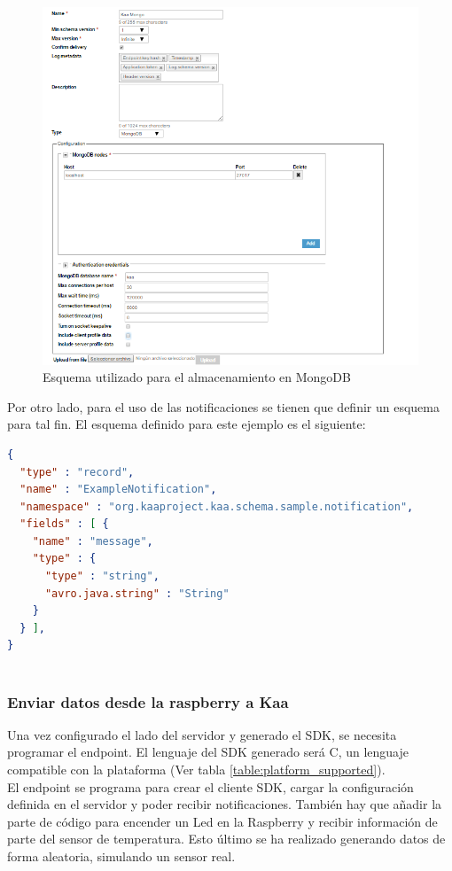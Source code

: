 \documentclass[12pt, twoside]{book}
\begin{document}
\begin{figure}[H]
\centering
\includegraphics[scale=0.6]{images/mongodb}
\caption{Esquema utilizado para el almacenamiento en MongoDB}\label{L508}
\end{figure}

Por otro lado, para el uso de las notificaciones se tienen que definir un esquema para tal fin. El esquema definido para este ejemplo es el siguiente:
\begin{lstfloat}
\begin{lstlisting}[language=json]
{
  "type" : "record",
  "name" : "ExampleNotification",
  "namespace" : "org.kaaproject.kaa.schema.sample.notification",
  "fields" : [ {
    "name" : "message",
    "type" : {
      "type" : "string",
      "avro.java.string" : "String"
    }
  } ],
}
 
\end{lstlisting}
\end{lstfloat}
\subsubsection*{Enviar datos desde la raspberry a Kaa}
Una vez configurado el lado del servidor y generado el SDK, se necesita programar el endpoint. El lenguaje del SDK generado será C, un lenguaje compatible con la plataforma (Ver tabla \ref{table:platform_supported}).\\
El endpoint se programa para crear el cliente SDK, cargar la configuración definida en el servidor y poder recibir notificaciones. También hay que añadir la parte de código para encender un Led en la Raspberry y recibir información de parte del sensor de temperatura. Esto último se ha realizado generando datos de forma aleatoria, simulando un sensor real. 
\end{document}
